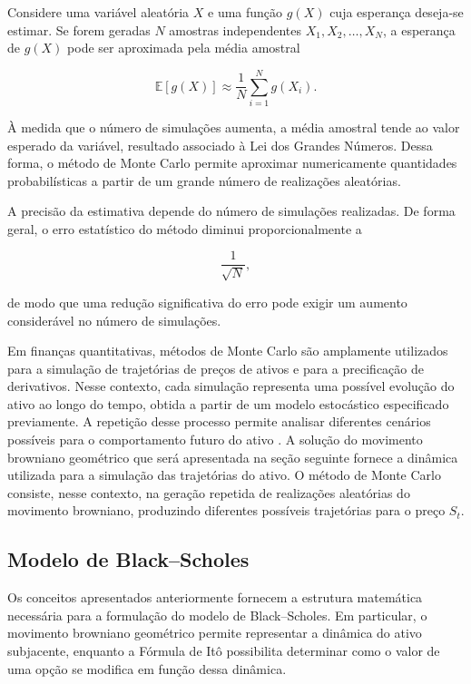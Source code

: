 Considere uma variável aleatória $X$ e uma função $g(X)$ cuja esperança
deseja-se estimar. Se forem geradas $N$ amostras independentes
$X_1,X_2,\ldots,X_N$, a esperança de $g(X)$ pode ser aproximada pela média
amostral

\begin{equation}
\mathbb{E}[g(X)]
\approx
\frac{1}{N}
\sum_{i=1}^{N} g(X_i).
\end{equation}

À medida que o número de simulações aumenta, a média amostral tende ao
valor esperado da variável, resultado associado à Lei dos Grandes Números.
Dessa forma, o método de Monte Carlo permite aproximar numericamente
quantidades probabilísticas a partir de um grande número de realizações
aleatórias.

A precisão da estimativa depende do número de simulações realizadas. De
forma geral, o erro estatístico do método diminui proporcionalmente a

\begin{equation}
\frac{1}{\sqrt{N}},
\end{equation}

de modo que uma redução significativa do erro pode exigir um aumento
considerável no número de simulações.

Em finanças quantitativas, métodos de Monte Carlo são amplamente utilizados
para a simulação de trajetórias de preços de ativos e para a precificação de
derivativos. Nesse contexto, cada simulação representa uma possível evolução
do ativo ao longo do tempo, obtida a partir de um modelo estocástico
especificado previamente. A repetição desse processo permite analisar
diferentes cenários possíveis para o comportamento futuro do ativo
\cite{glasserman2003}. A solução do movimento browniano geométrico que será apresentada na seção seguinte
fornece a dinâmica utilizada para a simulação das trajetórias do ativo.
O método de Monte Carlo consiste, nesse contexto, na geração repetida de
realizações aleatórias do movimento browniano, produzindo diferentes
possíveis trajetórias para o preço $S_t$.

\subsection{Modelo de Black--Scholes}

Os conceitos apresentados anteriormente fornecem a estrutura matemática
necessária para a formulação do modelo de Black--Scholes. Em particular,
o movimento browniano geométrico permite representar a dinâmica do ativo
subjacente, enquanto a Fórmula de Itô possibilita determinar como o valor
de uma opção se modifica em função dessa dinâmica.

